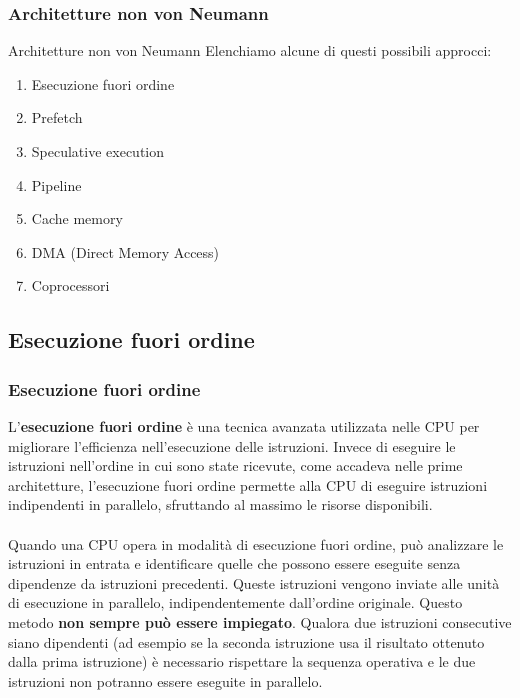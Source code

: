 \begin{frame}
	\frametitle{Architetture non von Neumann}

	\begin{block}{Architetture non von Neumann}
		Elenchiamo alcune di questi possibili approcci:
		\begin{enumerate}
			\item Esecuzione fuori ordine
			\item Prefetch
			\item Speculative execution
			\item Pipeline
			\item Cache memory
			\item DMA (Direct Memory Access)
			\item Coprocessori
		\end{enumerate}
	\end{block}

\end{frame}


\subsection[Esecuzione fuori ordine]{Esecuzione fuori ordine}
\begin{frame}
	\frametitle{ Esecuzione fuori ordine}

		L'\textbf{esecuzione fuori ordine} è una tecnica avanzata utilizzata nelle CPU per migliorare l'efficienza nell'esecuzione delle istruzioni. Invece di eseguire le istruzioni nell'ordine in cui sono state ricevute, come accadeva nelle prime architetture, l'esecuzione fuori ordine permette alla CPU di eseguire istruzioni indipendenti in parallelo, sfruttando al massimo le risorse disponibili.\\~\\		
		Quando una CPU opera in modalità di esecuzione fuori ordine, può analizzare le istruzioni in entrata e identificare quelle che possono essere eseguite senza dipendenze da istruzioni precedenti. Queste istruzioni vengono inviate alle unità di esecuzione in parallelo, indipendentemente dall'ordine originale. Questo metodo \textbf{non sempre può essere impiegato}. Qualora due istruzioni consecutive siano dipendenti (ad esempio se la seconda istruzione usa il risultato ottenuto dalla prima istruzione) è necessario rispettare la sequenza operativa e le due istruzioni non potranno essere eseguite in parallelo.

\end{frame}


